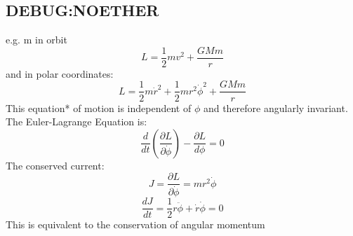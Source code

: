 \subsection{DEBUG:NOETHER} %
\label{sub:tmp_noether}
e.g. m in orbit
\begin{equation*}
	L = \frac{1}{2}mv^{2} + \frac{GMm}{r}
\end{equation*}
and in polar coordinates:
\begin{equation*}
	L = \frac{1}{2}m\dot{r}^{2} + \frac{1}{2}mr^{2}\dot{\phi}^{2} + \frac{GMm}{r}
\end{equation*}
This equation* of motion is independent of $\phi$ and therefore angularly invariant.
The Euler-Lagrange Equation is:  
\begin{equation*}
	\frac{d}{dt}\left(\frac{\partial L}{\partial\dot{\phi}}\right) - \frac{\partial L}{d\phi}  = 0
\end{equation*}
The conserved current:
\begin{equation*}
	J = \frac{\partial L}{\partial\dot{\phi}} = mr^{2}\dot{\phi}
\end{equation*}
\begin{equation*}
	\frac{dJ}{dt} = \frac{1}{2}r\ddot{\phi} + \dot{r}\dot{\phi} = 0
\end{equation*}
This is equivalent to the conservation of angular momentum

